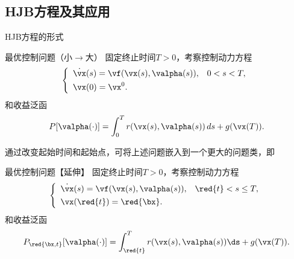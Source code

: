 \subsection{HJB方程及其应用} 
\begin{frame}{HJB方程的形式}  
\small 
\begin{block}{最优控制问题（小$\rightarrow $大）}
固定终止时间$T>0$，考察控制动力方程
\begin{equation}
\left\{
\begin{array}{ll}
    \dot \vx(s) = \vf(\vx(s), \valpha(s)), & 0<s<T, \\[0.05in]
     \vx(0) = \vx^0.& 
\end{array}
\right.
\end{equation}
和收益泛函
\begin{equation}
    P[\valpha(\cdot)] = \int_0^T r(\vx(s),\valpha(s))\,ds + g(\vx(T)). 
\end{equation}
\end{block}
\pause 
通过改变起始时间和起始点，可将上述问题嵌入到一个更大的问题类，即
\begin{block}{最优控制问题【延伸】}
固定终止时间$T>0$，考察控制动力方程
\begin{equation}
\left\{
\begin{array}{ll}
    \dot \vx(s) = \vf(\vx(s), \valpha(s)), & \red{t}<s\le T, \\[0.05in]
     \vx(\red{t}) = \red{\bx}.& 
\end{array}
\right.
\end{equation}
和收益泛函
\begin{equation}
    P_{\red{\bx,t}}[\valpha(\cdot)] = \int_{\red{t}}^T r(\vx(s),\valpha(s))\ds + g(\vx(T)). 
\end{equation}
\end{block}
\end{frame}

